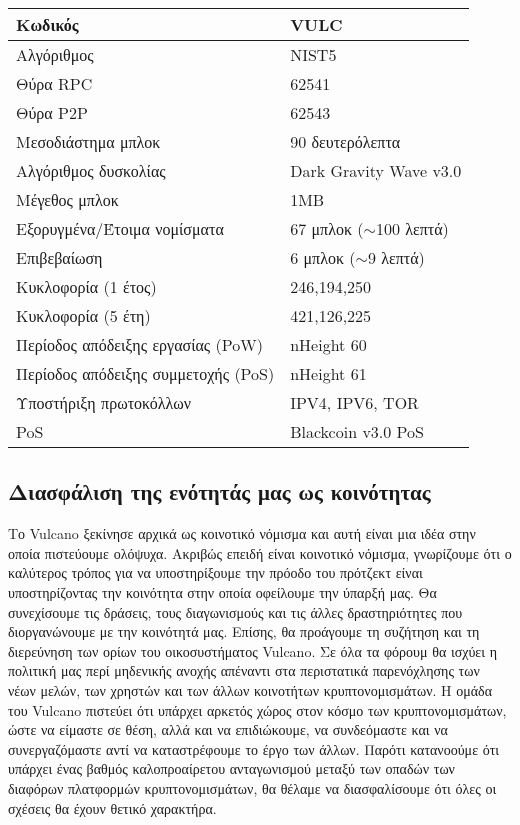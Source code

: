\documentclass[A4paper, 12pt]{article}
\begin{document}
\begin{table}[h]
\centering
\begin{tabular}{@{}ll@{}}
\toprule
Κωδικός & VULC \\ \midrule
Αλγόριθμος & NIST5 \\
Θύρα RPC & 62541 \\
Θύρα P2P & 62543 \\
Μεσοδιάστημα μπλοκ & 90 δευτερόλεπτα \\
Αλγόριθμος δυσκολίας & Dark Gravity Wave v3.0 \\
Μέγεθος μπλοκ & 1MB \\
Εξορυγμένα/Έτοιμα νομίσματα & 67 μπλοκ ($\sim$100 λεπτά) \\
Επιβεβαίωση & 6 μπλοκ ($\sim$9 λεπτά) \\
Κυκλοφορία (1 έτος) & 246,194,250 \\
Κυκλοφορία (5 έτη) & 421,126,225 \\
Περίοδος απόδειξης εργασίας (PoW) & nHeight 60 \\
Περίοδος απόδειξης συμμετοχής (PoS) & nHeight 61 \\
Υποστήριξη πρωτοκόλλων & IPV4, IPV6, TOR \\
PoS & Blackcoin v3.0 PoS \\ \bottomrule
\end{tabular}
\end{table}

\subsection{Διασφάλιση της ενότητάς μας ως κοινότητας}
Το Vulcano ξεκίνησε αρχικά ως κοινοτικό νόμισμα και αυτή είναι μια ιδέα στην οποία πιστεύουμε ολόψυχα. Ακριβώς επειδή είναι κοινοτικό νόμισμα, γνωρίζουμε ότι ο καλύτερος τρόπος για να υποστηρίξουμε την πρόοδο του πρότζεκτ είναι υποστηρίζοντας την κοινότητα στην οποία οφείλουμε την ύπαρξή μας. Θα συνεχίσουμε τις δράσεις, τους διαγωνισμούς και τις άλλες δραστηριότητες που διοργανώνουμε με την κοινότητά μας. Επίσης, θα προάγουμε τη συζήτηση και τη διερεύνηση των ορίων του οικοσυστήματος Vulcano. Σε όλα τα φόρουμ θα ισχύει η πολιτική μας περί μηδενικής ανοχής απέναντι στα περιστατικά παρενόχλησης των νέων μελών, των χρηστών και των άλλων κοινοτήτων κρυπτονομισμάτων. Η ομάδα του Vulcano πιστεύει ότι υπάρχει αρκετός χώρος στον κόσμο των κρυπτονομισμάτων, ώστε να είμαστε σε θέση, αλλά και να επιδιώκουμε, να συνδεόμαστε και να συνεργαζόμαστε αντί να καταστρέφουμε το έργο των άλλων. Παρότι κατανοούμε ότι υπάρχει ένας βαθμός καλοπροαίρετου ανταγωνισμού μεταξύ των οπαδών των διαφόρων πλατφορμών κρυπτονομισμάτων, θα θέλαμε να διασφαλίσουμε ότι όλες οι σχέσεις θα έχουν θετικό χαρακτήρα.
\end{document}
